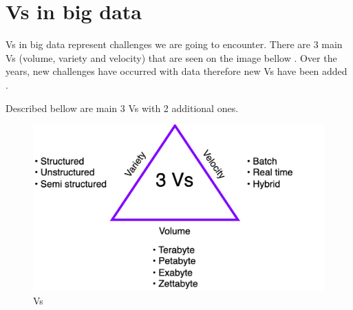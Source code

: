 \section{Vs in big data}\label{Vs}
Vs in big data represent challenges we are going to encounter. There are 3 main Vs (volume, variety and velocity) that are seen on the image bellow \parencite{sagiroglu2013big}. Over the years, new challenges have occurred with data therefore new Vs have been added \parencite{anuradha2015brief}. 

Described bellow are main 3 Vs with 2 additional ones.

\begin{figure}[H]
\includegraphics[scale=0.25]{img/Vs/BigData-Vs.png}
\centering
\caption{Vs}
\label{fig:Vs}
\end{figure}


\newpage







